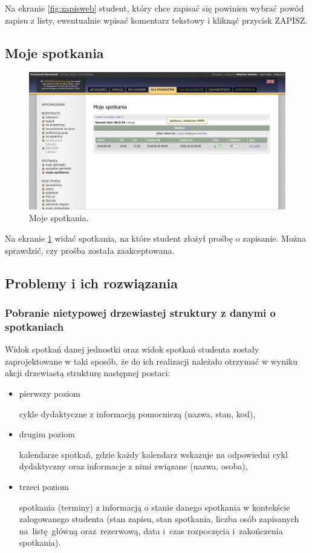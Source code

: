 \documentclass[licencjacka]{pracamgr}
\begin{document}
Na ekranie \ref{fig:zapisweb} student, który chce zapisać się powinien wybrać powód zapisu z listy, ewentualnie wpisać komentarz tekstowy i kliknąć przycisk \textsf{ZAPISZ}.

\subsection{Moje spotkania}

\begin{figure}[!]
  \includegraphics[width=\linewidth]{mojeSpotkaniaUSOSweb.jpg}
  \caption{Moje spotkania.}
  \label{fig:mojeweb}
\end{figure}

Na ekranie \ref{fig:mojeweb} widać spotkania, na które student złożył prośbę o zapisanie. Można sprawdzić, czy prośba została zaakceptowana.

\subsection{Problemy i ich rozwiązania}
\subsubsection{Pobranie nietypowej drzewiastej struktury z danymi o spotkaniach}
Widok spotkań danej jednostki oraz widok spotkań studenta zostały zaprojektowane w taki sposób, że do ich realizacji należało otrzymać w wyniku akcji drzewiastą strukturę następnej postaci:

\begin{itemize}
\item{pierwszy poziom}

cykle dydaktyczne z informacją pomocniczą (nazwa, stan, kod),
\item{drugim poziom}

kalendarze spotkań, gdzie każdy kalendarz wskazuje na odpowiedni cykl dydaktyczny oraz informacje z nimi związane (nazwa, osoba),
\item{trzeci poziom}

spotkania (terminy) z informacją o stanie danego spotkania w kontekście zalogowanego studenta (stan zapisu, stan spotkania, liczba osób zapisanych na~listę~główną oraz~rezerwową, data i~czas rozpoczęcia i~zakończenia spotkania).
\end{itemize}
\end{document}
